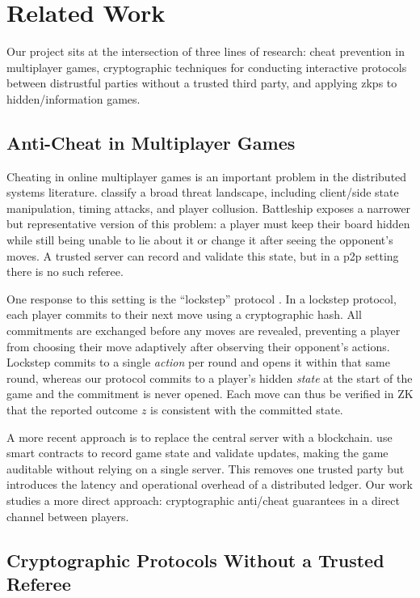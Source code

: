 \section{Related Work}
\label{sec:relatedWork}

Our project sits at the intersection of three lines of research: cheat prevention in  multiplayer games, cryptographic techniques for conducting interactive protocols between distrustful parties without a trusted third party, and applying \glspl{zkp} to hidden\-/information games.

\subsection{Anti-Cheat in Multiplayer Games}

Cheating in online multiplayer games is an important problem in the distributed systems literature. \Textcite{yan05} classify a broad threat landscape, including client\-/side state manipulation, timing attacks, and player collusion. Battleship exposes a narrower but representative version of this problem: a player must keep their board hidden while still being unable to lie about it or change it after seeing the opponent's moves. A trusted server can record and validate this state, but in a \gls{p2p} setting there is no such referee.

One response to this setting is the \enquote{lockstep} protocol \cite{baughman01}. In a lockstep protocol, each player commits to their next move using a cryptographic hash. All commitments are exchanged before any moves are revealed, preventing a player from choosing their move adaptively after observing their opponent's actions. Lockstep commits to a single \textit{action} per round and opens it within that same round, whereas our protocol commits to a player's hidden \textit{state} at the start of the game and the commitment is never opened. Each move can thus be verified in \gls{ZK} that the reported outcome $z$ is consistent with the committed state.

A more recent approach is to replace the central server with a blockchain. \Textcite{kalra18} use smart contracts to record game state and validate updates, making the game auditable without relying on a single server. This removes one trusted party but introduces the latency and operational overhead of a distributed ledger. Our work studies a more direct approach: cryptographic anti\-/cheat guarantees in a direct channel between players.

\subsection{Cryptographic Protocols Without a Trusted Referee}

